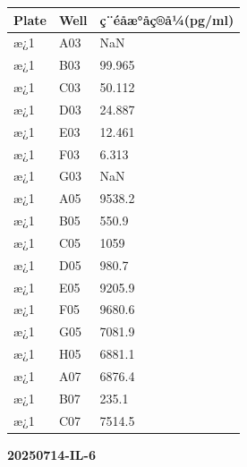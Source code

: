 \documentclass[UTF8,10pt,a4paper,fontset=fandol]{ctexart}
\begin{document}
\begin{tabularx}{\textwidth}{@{}llX@{}}
\textbf{Plate} & \textbf{Well} & \textbf{ç¨éåæ°åç®å¼(pg/ml)} \\ \hline
æ¿1 & A03 & NaN \\
æ¿1 & B03 & 99.965 \\
æ¿1 & C03 & 50.112 \\
æ¿1 & D03 & 24.887 \\
æ¿1 & E03 & 12.461 \\
æ¿1 & F03 & 6.313 \\
æ¿1 & G03 & NaN \\
æ¿1 & A05 & 9538.2 \\
æ¿1 & B05 & 550.9 \\
æ¿1 & C05 & 1059 \\
æ¿1 & D05 & 980.7 \\
æ¿1 & E05 & 9205.9 \\
æ¿1 & F05 & 9680.6 \\
æ¿1 & G05 & 7081.9 \\
æ¿1 & H05 & 6881.1 \\
æ¿1 & A07 & 6876.4 \\
æ¿1 & B07 & 235.1 \\
æ¿1 & C07 & 7514.5 \\
\end{tabularx}


\newpage

\noindent\textbf{20250714-IL-6}
\end{document}
